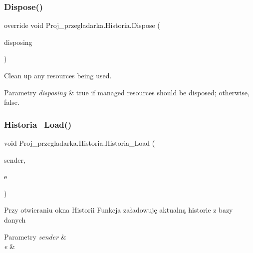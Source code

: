 \subsubsection{\texorpdfstring{Dispose()}{Dispose()}}
{\footnotesize\ttfamily override void Proj\+\_\+przegladarka.\+Historia.\+Dispose (\begin{DoxyParamCaption}\item[{bool}]{disposing }\end{DoxyParamCaption})\hspace{0.3cm}{\ttfamily [protected]}}



Clean up any resources being used. 


\begin{DoxyParams}{Parametry}
{\em disposing} & true if managed resources should be disposed; otherwise, false.\\
\hline
\end{DoxyParams}
\mbox{\label{class_proj__przegladarka_1_1_historia_af8bf56b0e46ea9bd99e7ae5894cc26ee}} 
\subsubsection{\texorpdfstring{Historia\_Load()}{Historia\_Load()}}
{\footnotesize\ttfamily void Proj\+\_\+przegladarka.\+Historia.\+Historia\+\_\+\+Load (\begin{DoxyParamCaption}\item[{object}]{sender,  }\item[{Event\+Args}]{e }\end{DoxyParamCaption})\hspace{0.3cm}{\ttfamily [private]}}



Przy otwieraniu okna Historii Funkcja załadowuję aktualną historie z bazy danych 


\begin{DoxyParams}{Parametry}
{\em sender} & \\
\hline
{\em e} & \\
\hline
\end{DoxyParams}
\mbox{\label{class_proj__przegladarka_1_1_historia_aefd4307c2dde898ce31c7b22c911514f}} 
